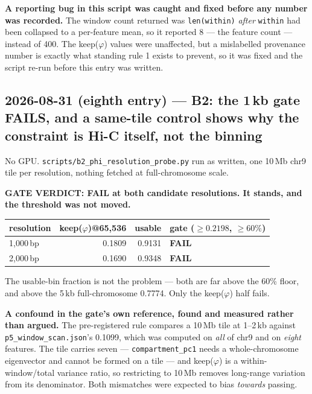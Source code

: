 \documentclass[11pt,a4paper]{article}
\newcommand{\code}[1]{\texttt{\small #1}}
\begin{document}
\textbf{A reporting bug in this script was caught and fixed before any number
was recorded.} The window count returned was \code{len(within)} \emph{after}
\code{within} had been collapsed to a per-feature mean, so it reported 8 --- the
feature count --- instead of 400. The keep($\varphi$) values were unaffected, but
a mislabelled provenance number is exactly what standing rule 1 exists to
prevent, so it was fixed and the script re-run before this entry was written.


\subsection*{2026-08-31 (eighth entry) --- B2: the 1\,kb gate FAILS, and a
same-tile control shows why the constraint is Hi-C itself, not the binning}

No GPU. \code{scripts/b2\_phi\_resolution\_probe.py} run as written, one
10\,Mb chr9 tile per resolution, nothing fetched at full-chromosome scale.

\textbf{GATE VERDICT: FAIL at both candidate resolutions. It stands, and the
threshold was not moved.}

\begin{center}
\begin{tabular}{lrrl}
\hline
resolution & keep($\varphi$)@65{,}536 & usable & gate ($\geq 0.2198$, $\geq 60\%$) \\
\hline
1{,}000\,bp & 0.1809 & 0.9131 & \textbf{FAIL} \\
2{,}000\,bp & 0.1690 & 0.9348 & \textbf{FAIL} \\
\hline
\end{tabular}
\end{center}

The usable-bin fraction is not the problem --- both are far above the 60\%
floor, and above the 5\,kb full-chromosome 0.7774. Only the keep($\varphi$)
half fails.

\textbf{A confound in the gate's own reference, found and measured rather than
argued.} The pre-registered rule compares a 10\,Mb tile at 1--2\,kb against
\code{p5\_window\_scan.json}'s 0.1099, which was computed on \emph{all} of
chr9 and on \emph{eight} features. The tile carries seven ---
\code{compartment\_pc1} needs a whole-chromosome eigenvector and cannot be
formed on a tile --- and keep($\varphi$) is a within-window/total variance
ratio, so restricting to 10\,Mb removes long-range variation from its
denominator. Both mismatches were expected to bias \emph{towards} passing.
\end{document}
